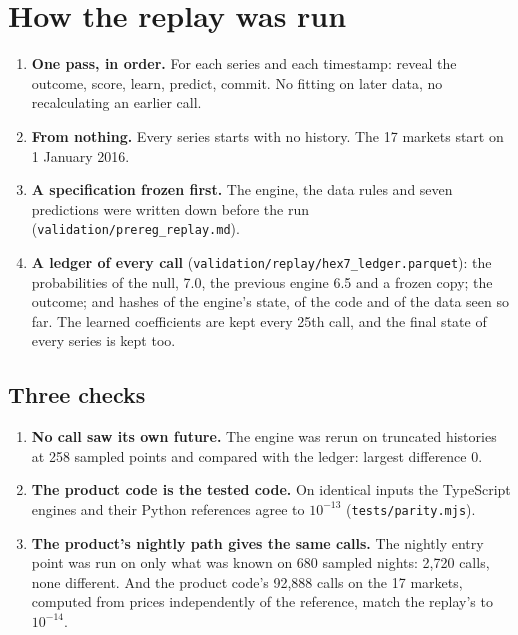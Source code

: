 \documentclass[10.5pt]{article}
\begin{document}
\section{How the replay was run}
\begin{enumerate}[leftmargin=1.4em,itemsep=1pt]
\item \textbf{One pass, in order.} For each series and each timestamp: reveal the outcome, score, learn, predict, commit. No fitting on later data, no recalculating an earlier call.
\item \textbf{From nothing.} Every series starts with no history. The 17 markets start on 1 January 2016.
\item \textbf{A specification frozen first.} The engine, the data rules and seven predictions were written down before the run (\texttt{validation/prereg\_replay.md}).
\item \textbf{A ledger of every call} (\texttt{validation/replay/hex7\_ledger.parquet}): the probabilities of the null, 7.0, the previous engine 6.5 and a frozen copy; the outcome; and hashes of the engine's state, of the code and of the data seen so far. The learned coefficients are kept every 25th call, and the final state of every series is kept too.
\end{enumerate}
\subsection*{Three checks}
\begin{enumerate}[leftmargin=1.4em,itemsep=1pt]
\item \textbf{No call saw its own future.} The engine was rerun on truncated histories at 258 sampled points and compared with the ledger: largest difference 0.
\item \textbf{The product code is the tested code.} On identical inputs the TypeScript engines and their Python references agree to $10^{-13}$ (\texttt{tests/parity.mjs}).
\item \textbf{The product's nightly path gives the same calls.} The nightly entry point was run on only what was known on 680 sampled nights: 2,720 calls, none different. And the product code's 92,888 calls on the 17 markets, computed from prices independently of the reference, match the replay's to $10^{-14}$.
\end{enumerate}
\end{document}
